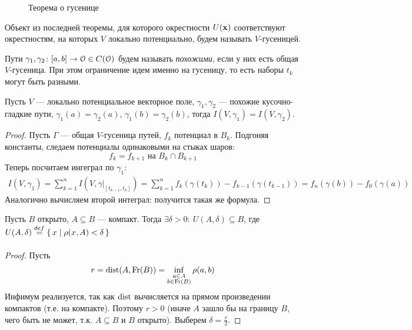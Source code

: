 \newpage

\begin{figure}[ht]
    \centering
    \caption{Теорема о гусенице}
\end{figure}

\begin{definition}
    Объект из последней теоремы, для которого окрестности $U(\mathbf{x})$ соответствуют
    окрестностям, на которых $V$ локально потенциально, будем называть $V$-гусеницей.
\end{definition}

\begin{definition}
    Пути $\gamma_1, \gamma_2 \colon [a, b] \to \mathcal{O} \in C(\mathcal{O})$ будем называть
    \textit{похожими}, если у них есть общая $V$-гусеница. При этом ограничение
    идем именно на гусеницу, то есть наборы $t_k$ могут быть разными.
\end{definition}

\begin{lemma}

    Пусть $V$ --- локально потенциальное векторное поле, $\gamma_1, \gamma_2$ ---
    похожие кусочно-гладкие пути, $\gamma_1(a) = \gamma_2(a)$,
    $\gamma_1(b) = \gamma_2(b)$, тогда $I(V, \gamma_1) = I(V, \gamma_2)$.
\end{lemma}
\begin{proof}
    Пусть $\Gamma$ --- общая $V$-гусеница путей, $f_k$ потенциал в $B_k$.
    Подгоняя константы, следаем потенциалы одинаковыми на стыках шаров:
\[
    f_k = f_{k + 1} \text{ на } B_k \cap B_{k + 1}
\]
    Теперь посчитаем ингеграл по $\gamma_1$:
\begin{align*}
    I(V, \gamma_1) = \sum_{k = 1}^{n}{I\left(V, \gamma\big|_{[t_{k - 1}, t_k]}\right)}
    = \sum_{k = 1}^{n}{f_k(\gamma(t_k)) - f_{k - 1}(\gamma(t_{k - 1}))}
    = f_n(\gamma(b)) - f_0(\gamma(a))
\end{align*}
    Аналогично вычисляем второй интеграл: получится такая же формула.
\end{proof}

\begin{lemma}
    Пусть $B$ открыто, $A \subseteq B$ --- компакт. Тогда $\exists \delta > 0\colon
    ~ U(A, \delta) \subseteq B$, где $U(A, \delta) \overset{def}{\underset{}{=}} \{\, x \mid \rho(x, A) < \delta \,\}$
\end{lemma}
\begin{proof}
    Пусть
\[
    r = \operatorname{dist}(A, \operatorname{Fr}(B)) = \inf_{\substack{a \in A \\ b \in \operatorname{Fr}(B)}}{\rho(a, b)}
\]
    Инфимум реализуется, так как $\operatorname{dist}$ вычисляется на прямом произведении
    компактов (т.е. на компакте). Поэтому $r > 0$ (иначе $A$ зашло бы на границу
    $B$, чего быть не может, т.к. $A \subseteq B$ и $B$ открыто). Выберем
    $\displaystyle \delta = \frac{r}{2}$.
\end{proof}

